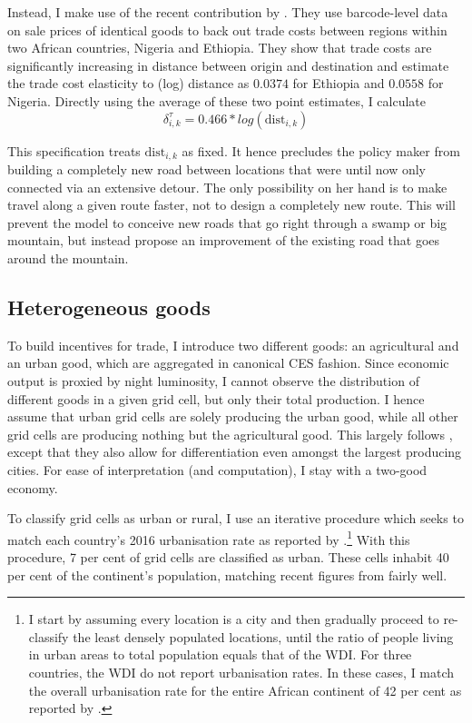 \documentclass[11pt, oneside]{article}   	%
\begin{document}
Instead, I make use of the recent contribution by \cite{atkin_whos_2015}. They use barcode-level data on sale prices of identical goods to back out trade costs between regions within two African countries, Nigeria and Ethiopia. They show that trade costs are significantly increasing in distance between origin and destination and estimate the trade cost elasticity to (log) distance as $0.0374$ for Ethiopia and $0.0558$ for Nigeria. Directly using the average of these two point estimates, I calculate
\begin{equation}
  \delta^{\tau}_{i,k} =  0.466*log(\textrm{dist}_{i,k})
\end{equation}

This specification treats $\textrm{dist}_{i,k}$ as fixed. It hence precludes the policy maker from building a completely new road between locations that were until now only connected via an extensive detour. The only possibility on her hand is to make travel along a given route faster, not to design a completely new route. This will prevent the model to conceive new roads that go right through a swamp or big mountain, but instead propose an improvement of the existing road that goes around the mountain.

\subsection{Heterogeneous goods}
To build incentives for trade, I introduce two different goods: an agricultural and an urban good, which are aggregated in canonical CES fashion. Since economic output is proxied by night luminosity, I cannot observe the distribution of different goods in a given grid cell, but only their total production. I hence assume that urban grid cells are solely producing the urban good, while all other grid cells are producing nothing but the agricultural good. This largely follows \citeauthor{fajgelbaum_optimal_2017}, except that they also allow for differentiation even amongst the largest producing cities. For ease of interpretation (and computation), I stay with a two-good economy.

To classify grid cells as urban or rural, I use an iterative procedure which seeks to match each country's 2016 urbanisation rate as reported by \cite{the_world_bank_world_2017}.\footnote{I start by assuming every location is a city and then gradually proceed to re-classify the least densely populated locations, until the ratio of people living in urban areas to total population equals that of the WDI. For three countries, the WDI do not report urbanisation rates. In these cases, I match the overall urbanisation rate for the entire African continent of 42 per cent as reported by \cite{lall_africas_2017}.} With this procedure, 7 per cent of grid cells are classified as urban. These cells inhabit 40 per cent of the continent's population, matching recent figures from \cite{lall_africas_2017} fairly well.
\end{document}
